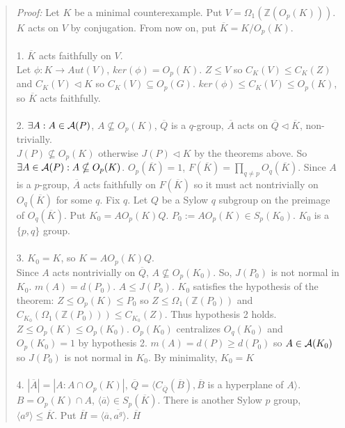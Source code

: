 \begin{quote}
\emph{Proof:}  Let $K$ be a minimal counterexample.  Put $V= \Omega_1({\mathbb Z}(O_p(K)))$. $K$ acts on $V$ by
conjugation. From now on, put ${\overline K} = K/O_p(K)$.
\\
\\
1. ${\overline K}$ acts faithfully on $V$.\\
Let $\phi: K \rightarrow Aut(V)$, $ker(\phi) = O_p(K)$.
$Z \leq V$ so $C_K(V) \leq C_K(Z)$ and $C_K(V) \lhd K$ so $C_K(V) \subseteq O_p(G)$.  $ ker(\phi) \leq C_K(V) \leq O_p(K)$,
so ${\overline K}$ acts faithfully.
\\
\\
2. $\exists A: A \in {\cal A}(P)$, $A \nsubseteq O_p(K)$, ${\overline Q}$ is a $q$-group, ${\overline A}$ acts on
${\overline Q} \lhd {\overline K}$, non-trivially. \\
$J(P) \nsubseteq O_p(K)$ otherwise $J(P) \lhd K$ by the theorems above.  So $\exists A \in {\cal A}(P): A \nsubseteq O_p(K)$.
$O_p({\overline K}) = 1$, $F({\overline K})= \prod_{q \ne p} O_q({\overline K})$.
Since $A$ is a $p$-group, ${\overline A}$ acts faithfully on $F({\overline K})$ so it must act
nontrivially on $O_q({\overline K})$ for some $q$.  Fix $q$.
Let $Q$ be a Sylow $q$ subgroup on the preimage of $O_q({\overline K})$.
Put $K_0 = A O_p(K)Q$.  $P_0 := A O_p(K) \in S_p(K_0)$.  $K_0$ is a $\{p, q \}$ group.
\\
\\
3. $K_0=K$, so $K= A O_p(K)Q$. \\
Since $A$ acts nontrivially on ${\overline Q}$, $A \nsubseteq O_p(K_0)$.
So, $J(P_0)$ is not normal in $K_0$.
$m(A)=d(P_0)$. $A \leq J(P_0)$.
$K_0$ satisfies the hypothesis of the theorem:
$Z \leq O_p(K) \leq P_0$ so $Z \leq \Omega_1({\mathbb Z}(P_0))$ and
$C_{K_0}(\Omega_1({\mathbb Z}(P_0))) \leq C_{K_0}(Z)$. Thus hypothesis 2 holds.  $Z \leq O_p(K) \leq O_p(K_0)$.  $O_p(K_0)$ centralizes $O_q(K_0)$
and $O_p(K_0)=1$ by hypothesis 2.  $m(A) =d(P) \geq d(P_0)$ so $A \in {\cal A}(K_0)$ so $J(P_0)$ is not normal in $K_0$.  By minimality, $K_0 = K$
\\
\\
4. $|{\overline A}| = |A: A \cap O_p(K)|$,
${\overline Q} = \langle C_{\overline Q}({\overline B}), {\overline B}$ is a hyperplane of $A \rangle$.
$B= O_p(K) \cap A$, $\langle {\overline a} \rangle \in S_p({\overline K})$.
There is another Sylow $p$ group,
$\langle a^g \rangle \leq {\overline K}$.  Put ${\overline H}= \langle {\overline a}, {\overline {a^g}} \rangle$. ${\overline H}$

\end{quote}
